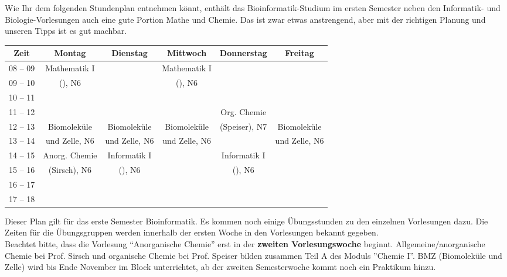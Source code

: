 Wie Ihr dem folgenden Stundenplan entnehmen könnt, enthält das Bioinformatik-Studium im ersten
Semester neben den Informatik- und Biologie-Vorlesungen auch eine gute Portion Mathe und Chemie.
Das ist zwar etwas anstrengend, aber mit der richtigen Planung und unseren Tipps ist es gut
machbar.

\begin{minipage}{\textwidth}
    \footnotesize
\begin{tabular}{|c|c|c|c|c|c|} \hline
Zeit      & 			Montag 		& Dienstag			& Mittwoch 			& Donnerstag 			& Freitag	 \\
\hline\hline
08 -- 09  & 		Mathematik I 	&  					& Mathematik I 		&  						&			\\
\cline{1-1}\cline{3-3}\cline{5-6}
09 -- 10  & 		(\Matheprof), N6& 					& (\Matheprof), N6  &  						&			\\
\hline
10 -- 11  &							&					&					&						&			\\
\hline
11 -- 12 & 							&  					&					& Org. Chemie 			& 			\\
\cline{1-4}\cline{6-6}
12 -- 13 & 			Biomoleküle		& Biomoleküle   	& Biomoleküle	    & (Speiser), N7			& Biomoleküle \\
\cline{1-1}\cline{5-5}
13 -- 14 & 			und Zelle, N6	& und Zelle, N6		& und Zelle, N6		& 						& und Zelle, N6 \\
\hline
14 -- 15 & 		Anorg. Chemie 		& Informatik I 		& 					& Informatik I 			& 				\\
\cline{1-1}\cline{4-4}\cline{6-6}
15 -- 16 &			 (Sirsch), N6  & (\Infoprof), N6 	& 					& (\Infoprof), N6 		& 				\\
\hline
16 -- 17 & & & & &\\
\hline
17 -- 18 & & & & & \\
\hline
\end{tabular}
\end{minipage}

Dieser Plan gilt für das erste Semester Bioinformatik. Es kommen noch einige Übungsstunden
zu den einzelnen Vorlesungen dazu. Die Zeiten für die Übungsgruppen werden innerhalb der ersten Woche in den Vorlesungen bekannt gegeben.\\
Beachtet bitte, dass die Vorlesung "`Anorganische Chemie"' erst in der \textbf{zweiten Vorlesungswoche} beginnt.
Allgemeine/anorganische Chemie bei Prof. Sirsch und organische Chemie bei Prof. Speiser bilden zusammen Teil A des Moduls ''Chemie I''.
BMZ (Biomoleküle und Zelle) wird bis Ende November im Block unterrichtet, ab der zweiten Semesterwoche kommt noch ein Praktikum hinzu.

